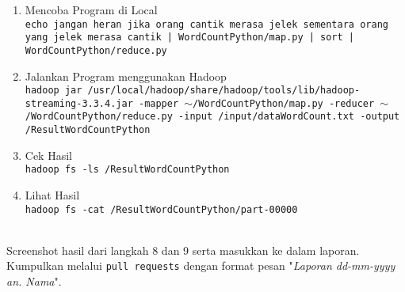 \documentclass[a4paper]{tufte-handout}
\begin{document}
\begin{enumerate}
\item Mencoba Program di Local \\
{\tt echo jangan heran jika orang cantik merasa jelek sementara orang yang jelek merasa cantik | WordCountPython/map.py | sort | WordCountPython/reduce.py}


\item Jalankan Program menggunakan Hadoop \\
{\tt hadoop jar /usr/local/hadoop/share/hadoop/tools/lib/hadoop-streaming-3.3.4.jar -mapper $\sim$/WordCountPython/map.py -reducer $\sim$/WordCountPython/reduce.py -input /input/dataWordCount.txt -output /ResultWordCountPython}

\item Cek Hasil \\
{\tt hadoop fs -ls /ResultWordCountPython}

\item Lihat Hasil \\
{\tt hadoop fs -cat /ResultWordCountPython/part-00000}
\end{enumerate}

\vspace*{-.5cm}
 \\
Screenshot hasil dari langkah 8 dan 9 serta masukkan ke dalam laporan. Kumpulkan melalui {\tt pull requests} dengan format pesan "\textit{Laporan dd-mm-yyyy an. Nama}".

\hrulefill

\clearpage
{}

\end{document}
